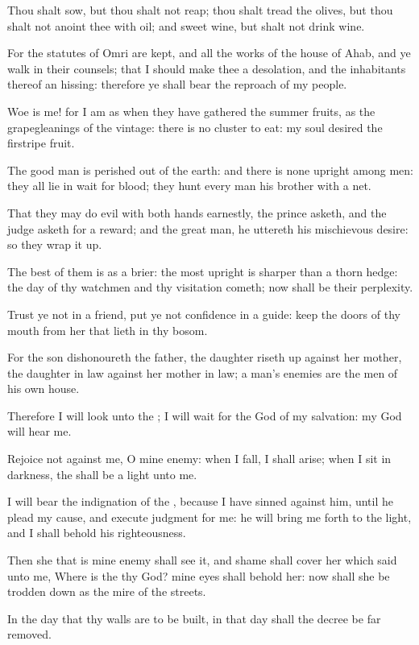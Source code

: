 \Verse Thou shalt sow, but thou shalt not reap; thou shalt tread the olives, but thou shalt not anoint thee with oil; and sweet wine, but shalt not drink wine.

\Verse For the statutes of Omri are kept, and all the works of the house of Ahab, and ye walk in their counsels; that I should make thee a desolation, and the inhabitants thereof an hissing: therefore ye shall bear the reproach of my people.


\Chapter
\Verse Woe is me! for I am as when they have gathered the summer fruits, as the grapegleanings of the vintage: there is no cluster to eat: my soul desired the firstripe fruit.

\Verse The good man is perished out of the earth: and there is none upright among men: they all lie in wait for blood; they hunt every man his brother with a net.

\Verse That they may do evil with both hands earnestly, the prince asketh, and the judge asketh for a reward; and the great man, he uttereth his mischievous desire: so they wrap it up.

\Verse The best of them is as a brier: the most upright is sharper than a thorn hedge: the day of thy watchmen and thy visitation cometh; now shall be their perplexity.

\Verse Trust ye not in a friend, put ye not confidence in a guide: keep the doors of thy mouth from her that lieth in thy bosom.

\Verse For the son dishonoureth the father, the daughter riseth up against her mother, the daughter in law against her mother in law; a man's enemies are the men of his own house.

\Verse Therefore I will look unto the \LORD; I will wait for the God of my salvation: my God will hear me.

\Verse Rejoice not against me, O mine enemy: when I fall, I shall arise; when I sit in darkness, the \LORD shall be a light unto me.

\Verse I will bear the indignation of the \LORD, because I have sinned against him, until he plead my cause, and execute judgment for me: he will bring me forth to the light, and I shall behold his righteousness.

\Verse Then she that is mine enemy shall see it, and shame shall cover her which said unto me, Where is the \LORD thy God? mine eyes shall behold her: now shall she be trodden down as the mire of the streets.

\Verse In the day that thy walls are to be built, in that day shall the decree be far removed.

